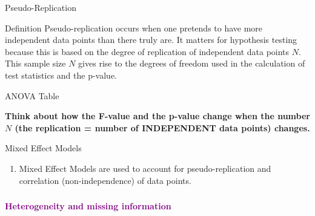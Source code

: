 \documentclass{beamer}
\begin{document}
\begin{frame}{Pseudo-Replication}
  \begin{block}{Definition}
    Pseudo-replication occurs when one pretends to have more independent data points than there truly are. It matters for hypothesis testing because this is based on the degree of replication of independent data points \(N\). This sample size \(N\) gives rise to the degrees of freedom used in the calculation of test statistics and the p-value.
  \end{block}
\end{frame}

\begin{frame}{ANOVA Table}

  \vspace{0.5cm}

  \normalsize
  \textbf{Think about how the F-value and the p-value change when the number $N$ (the replication = number of INDEPENDENT data points) changes.}
  
\end{frame}


\begin{frame}{Mixed Effect Models}
  \begin{enumerate}
      \item Mixed Effect Models are used to account for pseudo-replication and correlation (non-independence) of data points.
      \end{enumerate}
\end{frame}

\begin{frame}
  \frametitle{}
  \begin{center}
    \huge\textbf{\textcolor{purple}{Heterogeneity and missing information}}
  \end{center}
\end{frame}
\end{document}

